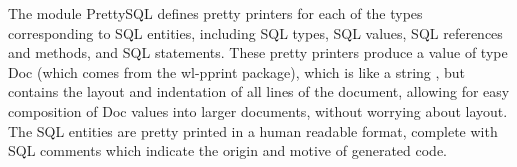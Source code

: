                     
                    
                    The module PrettySQL defines pretty printers for each of 
                    the types
                    corresponding to SQL entities, including SQL types, SQL 
                    values, SQL references
                    and methods, and SQL statements. These pretty printers 
                    produce a value of
                    type Doc (which comes from the wl-pprint package), which is 
                    like a string
                    , but contains the layout and indentation of all lines of 
                    the document,
                    allowing for easy composition of Doc values into larger 
                    documents, without
                    worrying about layout. The SQL entities are pretty printed 
                    in a human
                    readable format, complete with SQL comments which indicate 
                    the origin
                    and motive of generated code. 
                    
                    
                    
